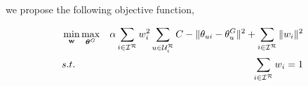 \iffalse
\textcolor{red}{ One way to characterize an item's riskiness level is to measure the deviation of all the users who rated that item from their aggregate risk degree. Note, $\|\theta_{ui} -\theta_u^G\|^2$  measures the deviation of user $u$ from her aggregate risk for item $i$.    To capture this intuition,  we introduce the combined error as: 
\begin{align}
\small
\epsilon = \sum_{i \in \mathcal{I}} \sum_{u \in \usersofIteminTrainset} w_i \theta_{ui} - \sum_{i \in \mathcal{I}} \sum_{u \in \mathcal{U}_i} w_i \theta_{u}^G 
\end{align}
 Our objective is to minimize  the square of the error term, i.e.,  $\min \| \epsilon \|^2$. 
}
\fi
\iffalse
in the following manner: 
\begin{align}
\small 
\min \  \| \sum_{i \in \mathcal{I}} \sum_{u \in \mathcal{U}_i} w_i \theta_{ui} - \sum_{i \in \mathcal{I}} \sum_{u \in \mathcal{U}_i} w_i \theta_{u}^G   \|^2
\label{eq:minWeightedDistance}
\end{align}

Furthermore, to simplify the objective function, we introduce an upper bound. It can be shown that for a constant $C$, 
we have:
\begin{align}
\small 
\| \epsilon \|^2 &= \|  \sum_{i \in \mathcal{I}} \sum_{u \in \mathcal{U}_i} w_i \theta_{ui} - \sum_{i \in \mathcal{I}} \sum_{u \in \mathcal{U}_i} w_i \theta_{u}^G  \|^2 \label{eq:minWeightedDistance}\\ &=
\| \sum_{i \in \mathcal{I}} \sum_{u \in \mathcal{U}_i}w_i (\theta_{ui}-\theta_{u}^G) \|^2 \\&\leq
C \sum_{i \in \mathcal{I}} \sum_{u \in \mathcal{U}_i} w_i^2\| (\theta_{ui}-\theta_{u}^G)\|^2\label{eq:upperBound}
\end{align}

Rather than minimize Eq.~\ref{eq:minWeightedDistance}, we minimize upper bound Eq.~\ref{eq:upperBound}. 
\fi
\iffalse
 we propose the following objective function, 

\begin{align}
&\min_{\mathbf{w}} \max_{\bm{\theta}^G} & \alpha \sum_{i \in  \mathcal{I}^{\mathcal{R}} } w_i^2 \sum_{u \in \mathcal{U}_{i}^{\mathcal{R}}} C - \|\theta_{ui} -\theta_u^G\|^2 + \sum_{i \in \mathcal{I}^{\mathcal{R}} }\|w_i\|^2 & \nonumber \\ 
&s.t. &\sum_{i \in \mathcal{I}^{\mathcal{R}} } w_i=1 &
\label{eq:thetaStarOpt}
\end{align}

